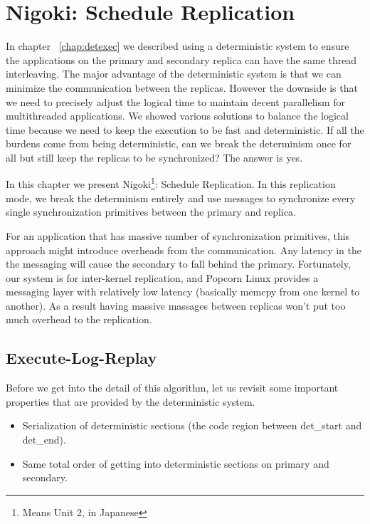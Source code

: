 \chapter{Nigoki: Schedule Replication} \label{chap:schedrep}
In chapter ~\ref{chap:detexec} we described using a deterministic system to ensure the applications on the primary and secondary replica can have the same thread interleaving. The major advantage of the deterministic system is that we can minimize the communication between the replicas. However the downside is that we need to precisely adjust the logical time to maintain decent parallelism for multithreaded applications. We showed various solutions to balance the logical time because we need to keep the execution to be fast and deterministic. If all the burdens come from being deterministic, can we break the determinism once for all but still keep the replicas to be synchronized? The answer is yes.

In this chapter we present Nigoki\footnote{Means Unit 2, in Japanese}: Schedule Replication. In this replication mode, we break the determinism entirely and use messages to synchronize every single synchronization primitives between the primary and replica.

For an application that has massive number of synchronization primitives, this approach might introduce overheads from the communication. Any latency in the the messaging will cause the secondary to fall behind the primary. Fortunately, our system is for inter-kernel replication, and Popcorn Linux provides a messaging layer with relatively low latency (basically memcpy from one kernel to another). As a result having massive massages between replicas won't put too much overhead to the replication.


\section{Execute-Log-Replay}
Before we get into the detail of this algorithm, let us revisit some important properties that are provided by the deterministic system.

\begin{itemize}
\item Serialization of deterministic sections (the code region between det\_start and det\_end). 
\item Same total order of getting into deterministic sections on primary and secondary.
\end{itemize}

